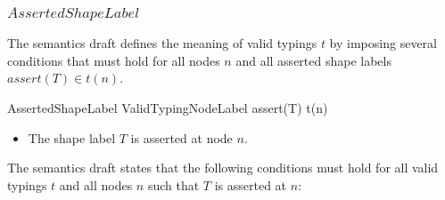 \documentclass{article}
\begin{document}
\subsubsection{$AssertedShapeLabel$}

The semantics draft defines the meaning of valid typings $t$ by imposing several conditions that must hold for all nodes $n$ and all
asserted shape labels $assert(T) \in t(n)$.
\begin{schema}{AssertedShapeLabel}
	ValidTypingNodeLabel
\where
	assert(T) \in t(n)
\end{schema}
\begin{itemize}
\item The shape label $T$ is asserted at node $n$.
\end{itemize}

The semantics draft states that the following conditions must hold for all valid typings $t$ and all nodes $n$ such that $T$ is asserted at $n$:
\end{document}
